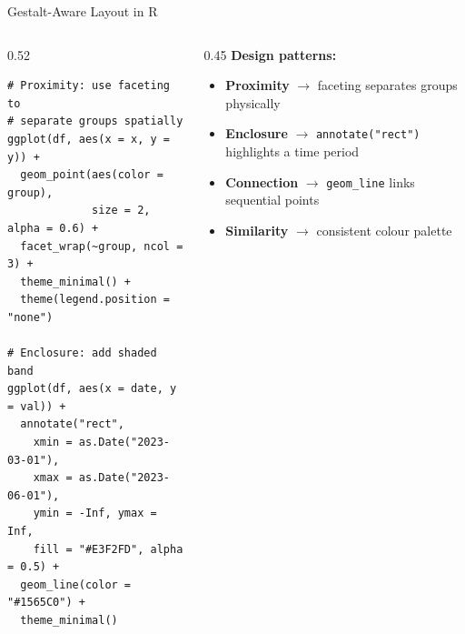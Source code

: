 \documentclass[10pt]{beamer}
\begin{document}
\begin{frame}[fragile]{Gestalt-Aware Layout in R}
  \begin{columns}[T]
    \begin{column}{0.52\textwidth}
\begin{lstlisting}[style=rstyle]
# Proximity: use faceting to
# separate groups spatially
ggplot(df, aes(x = x, y = y)) +
  geom_point(aes(color = group),
             size = 2, alpha = 0.6) +
  facet_wrap(~group, ncol = 3) +
  theme_minimal() +
  theme(legend.position = "none")

# Enclosure: add shaded band
ggplot(df, aes(x = date, y = val)) +
  annotate("rect",
    xmin = as.Date("2023-03-01"),
    xmax = as.Date("2023-06-01"),
    ymin = -Inf, ymax = Inf,
    fill = "#E3F2FD", alpha = 0.5) +
  geom_line(color = "#1565C0") +
  theme_minimal()
\end{lstlisting}
    \end{column}
    \begin{column}{0.45\textwidth}
      \textbf{Design patterns:}

      \begin{itemize}
        \item \textbf{Proximity} $\rightarrow$ faceting
              separates groups physically
        \item \textbf{Enclosure} $\rightarrow$ \texttt{annotate("rect")}
              highlights a time period
        \item \textbf{Connection} $\rightarrow$ \texttt{geom\_line}
              links sequential points
        \item \textbf{Similarity} $\rightarrow$ consistent
              colour palette
      \end{itemize}
    \end{column}
  \end{columns}
\end{frame}
\end{document}
